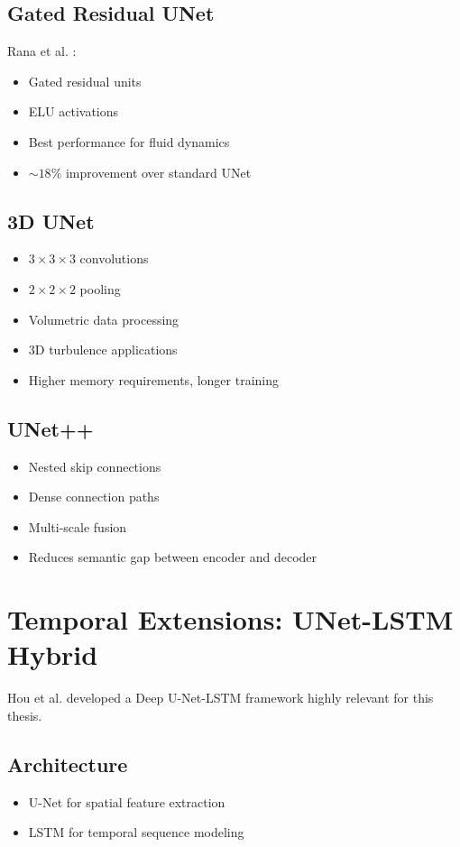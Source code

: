 \subsection{Gated Residual UNet}
Rana et al. \cite{rana2024}:
\begin{itemize}
    \item Gated residual units
    \item ELU activations
    \item Best performance for fluid dynamics
    \item $\sim 18\%$ improvement over standard UNet
\end{itemize}

\subsection{3D UNet}
\begin{itemize}
    \item $3 \times 3 \times 3$ convolutions
    \item $2 \times 2 \times 2$ pooling
    \item Volumetric data processing
    \item 3D turbulence applications
    \item Higher memory requirements, longer training
\end{itemize}

\subsection{UNet++}
\begin{itemize}
    \item Nested skip connections
    \item Dense connection paths
    \item Multi-scale fusion
    \item Reduces semantic gap between encoder and decoder
\end{itemize}

\section{Temporal Extensions: UNet-LSTM Hybrid}

Hou et al. \cite{hou2022} developed a Deep U-Net-LSTM framework highly relevant for this thesis.

\subsection{Architecture}
\begin{itemize}
    \item U-Net for spatial feature extraction
    \item LSTM for temporal sequence modeling
\end{itemize}

